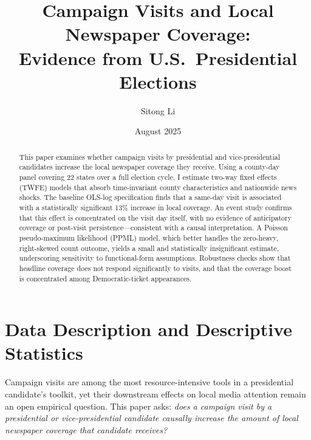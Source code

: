 \documentclass{article}
\title{Campaign Visits and Local Newspaper Coverage:\\
Evidence from U.S.\ Presidential Elections}
\author{Sitong Li}
\date{August 2025}
\begin{document}
\maketitle

\begin{abstract}
This paper examines whether campaign visits by presidential and vice-presidential candidates
increase the local newspaper coverage they receive.
Using a county-day panel covering 22 states over a full election cycle, I estimate two-way
fixed effects (TWFE) models that absorb time-invariant county characteristics and nationwide
news shocks.
The baseline OLS-log specification finds that a same-day visit is associated with a
statistically significant 13\% increase in local coverage.
An event study confirms that this effect is concentrated on the visit day itself, with no
evidence of anticipatory coverage or post-visit persistence---consistent with a causal
interpretation.
A Poisson pseudo-maximum likelihood (PPML) model, which better handles the zero-heavy,
right-skewed count outcome, yields a small and statistically insignificant estimate,
underscoring sensitivity to functional-form assumptions.
Robustness checks show that headline coverage does not respond significantly to visits, and
that the coverage boost is concentrated among Democratic-ticket appearances.
\end{abstract}


\section{Data Description and Descriptive Statistics}
\label{sec:data}

Campaign visits are among the most resource-intensive tools in a presidential candidate's
toolkit, yet their downstream effects on local media attention remain an open empirical
question.
This paper asks: \emph{does a campaign visit by a presidential or vice-presidential
candidate causally increase the amount of local newspaper coverage that candidate
receives?}
\end{document}
